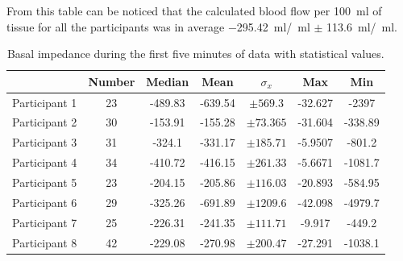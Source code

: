 From this table can be noticed that the calculated blood flow per \SI{100}{\ml} of tissue for all the participants was in average \SI{-295.42}{\ml / \ml} $\pm$ \SI{113.6}{\ml/\ml}. 

 \begin{table}[t]
 	\caption{Basal impedance during the first five minutes of data with statistical values.}
 	\label{tbl:blood_flow:region2}
 	\centering
 	\begin{tabu}{lcccccc}
 		\hline
 		& \textbf{Number} & \textbf{Median} & \textbf{Mean} & \textbf{$\sigma_x$} & \textbf{Max} & \textbf{Min} \\\hline
 		Participant 1 &       23        &     -489.83     &    -639.54    &       $\pm 569.3$        & -32.627      & -2397        \\
 		Participant 2 &       30        &     -153.91     &    -155.28    &       $\pm73.365$        & -31.604      & -338.89      \\
 		Participant 3 &       31        &     -324.1      &    -331.17    &       $\pm185.71$        & -5.9507      & -801.2       \\
 		Participant 4 &       34        &     -410.72     &    -416.15    &       $\pm261.33$        & -5.6671      & -1081.7      \\
 		Participant 5 &       23        &     -204.15     &    -205.86    &       $\pm116.03$        & -20.893      & -584.95      \\
 		Participant 6 &       29        &     -325.26     &    -691.89    &       $\pm1209.6$        & -42.098      & -4979.7      \\
 		Participant 7 &       25        &     -226.31     &    -241.35    &       $\pm111.71$        & -9.917       & -449.2       \\
 		Participant 8 &       42        &     -229.08     &    -270.98    &       $\pm200.47$        & -27.291      & -1038.1      \\\hline
 	\end{tabu} 
 \end{table}


